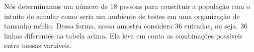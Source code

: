 Nós determinamos um número de 18 pessoas para constituir a população com o intuito de simular como seria um ambiente de testes em uma organização de tamanho médio. Dessa forma, nossa amostra considera 36 entradas, ou seja, 36 linhas diferentes na tabela acima. Ela leva em conta as combinações possíveis entre nossas variáveis.

